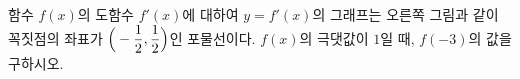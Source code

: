 \noindent\begin{minipage}[t]{0.58\linewidth}\vspace{0pt}\raggedright 함수 $f(x)$의 도함수 $f'(x)$에 대하여 $y=f'(x)$의 그래프는 오른쪽 그림과 같이 꼭짓점의 좌표가 $\Big(-\dfrac{1}{2}{,}\mkern3mu\mathopen{}\dfrac{1}{2}\Big)$인 포물선이다. $f(x)$의 극댓값이 $1$일 때, $f(-3)$의 값을 구하시오.\end{minipage}\hfill\begin{minipage}[t]{0.4\linewidth}\vspace{0pt}\centering \resizebox{\ifdim\width>\linewidth\linewidth\else\width\fi}{!}{}\end{minipage}\par
